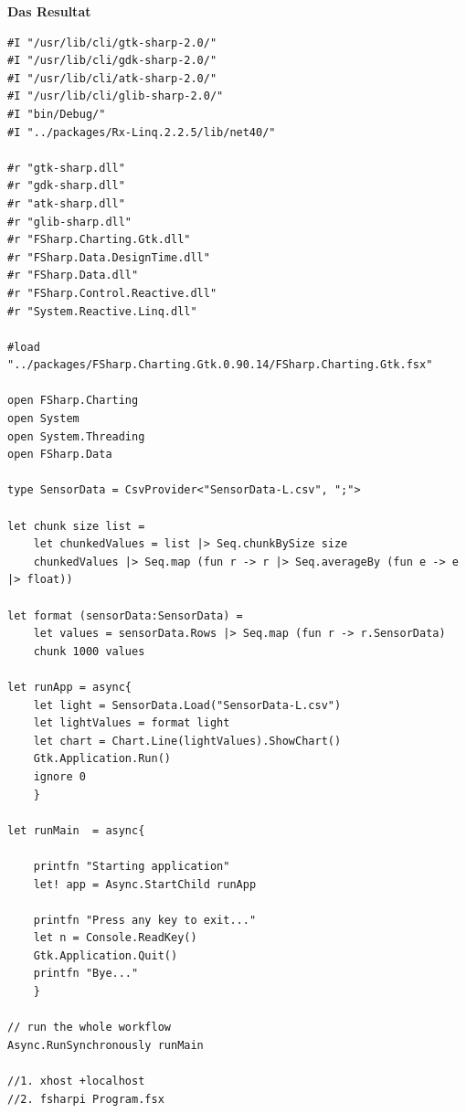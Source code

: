 \textbf{Das Resultat} \\
\begin{lstlisting}
#I "/usr/lib/cli/gtk-sharp-2.0/"
#I "/usr/lib/cli/gdk-sharp-2.0/"
#I "/usr/lib/cli/atk-sharp-2.0/"
#I "/usr/lib/cli/glib-sharp-2.0/"
#I "bin/Debug/"
#I "../packages/Rx-Linq.2.2.5/lib/net40/"

#r "gtk-sharp.dll"
#r "gdk-sharp.dll"
#r "atk-sharp.dll"
#r "glib-sharp.dll"
#r "FSharp.Charting.Gtk.dll"
#r "FSharp.Data.DesignTime.dll"
#r "FSharp.Data.dll"
#r "FSharp.Control.Reactive.dll"
#r "System.Reactive.Linq.dll"

#load "../packages/FSharp.Charting.Gtk.0.90.14/FSharp.Charting.Gtk.fsx"

open FSharp.Charting
open System
open System.Threading
open FSharp.Data

type SensorData = CsvProvider<"SensorData-L.csv", ";">

let chunk size list =
    let chunkedValues = list |> Seq.chunkBySize size
    chunkedValues |> Seq.map (fun r -> r |> Seq.averageBy (fun e -> e |> float))

let format (sensorData:SensorData) =
    let values = sensorData.Rows |> Seq.map (fun r -> r.SensorData)
    chunk 1000 values

let runApp = async{
    let light = SensorData.Load("SensorData-L.csv")
    let lightValues = format light
    let chart = Chart.Line(lightValues).ShowChart()
    Gtk.Application.Run()
    ignore 0
    }

let runMain  = async{

    printfn "Starting application"
    let! app = Async.StartChild runApp

    printfn "Press any key to exit..."
    let n = Console.ReadKey()
    Gtk.Application.Quit()
    printfn "Bye..."
    }

// run the whole workflow
Async.RunSynchronously runMain  

//1. xhost +localhost
//2. fsharpi Program.fsx
\end{lstlisting}